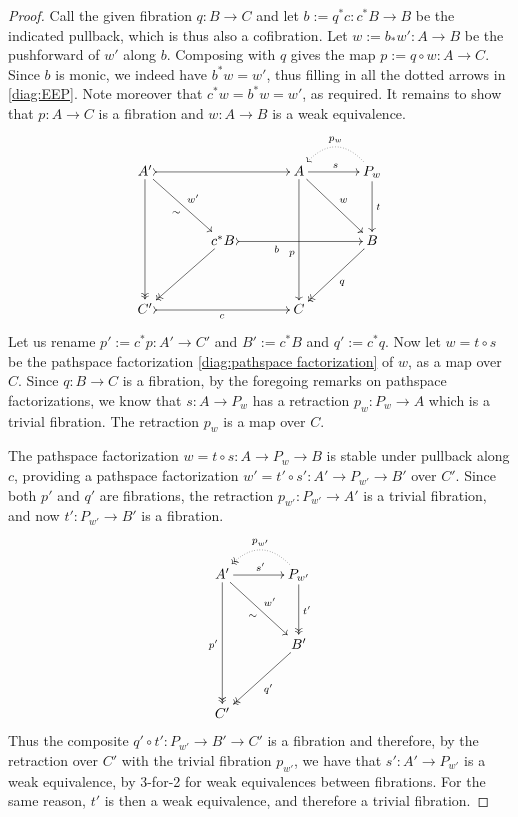 \documentclass[12pt]{article}
\newcommand{\ra}{\ensuremath{\rightarrow}}
\theoremstyle{remark}
\theoremstyle{definition}
\begin{document}
\begin{proof}
Call the given fibration $q:B\ra C$ and let $b:=  q^*c : c^*B \ra B$ be the indicated pullback, which is thus also a cofibration. Let $w := b_*w' : A\ra B$ be the pushforward of $w'$ along $b$.  Composing with $q$ gives the map $p:= q\circ w:A\ra C$.  Since $b$ is monic, we indeed have $b^*w = w'$, thus filling in all the dotted arrows in \eqref{diag:EEP}.  Note moreover that $c^*w =  b^*w = w'$, as required. It remains to show that $p:A\ra C$ is a fibration and $w : A\ra B$ is a weak equivalence.   
\begin{equation}\label{diag:EEPfactored}
\xymatrix@=1.5em{
A' \ar@{->>}[dddd] \ar[rrdd]_{\sim}^{w'} \ar@{>->}[rrrr] && && A \ar[dddd]_>>>>>>>>>>>>p \ar[rrdd]^{w} \ar[rr]^s && \ar@{.>}@/_1.5pc/[ll]_{p_w} P_w \ar[dd]^t \\
\\
&& c^*B \ar@{->>}[lldd] \ar@{>->}[rrrr]_<<<<<<<<<<b  &&&& B \ar@{->>}[lldd]^q  \\
\\
C' \ar@{>->}[rrrr]_c &&&& C &&
}
\end{equation}
Let us rename $p':= c^*p : A' \ra C'$ and $B' := c^*B$ and $q':= c^*q$.
Now let $w=t\circ s$ be the pathspace factorization \eqref{diag:pathspace factorization} of $w$, as a map over $C$.  Since $q:B \ra C$ is a fibration, by the foregoing remarks on pathspace factorizations, we know that $s : A\ra P_w$ has a retraction $p_w : P_w \ra A$ which is a trivial fibration.  The retraction $p_w$ is a map over $C$.  

The pathspace factorization $w=t\circ s : A \ra P_w \ra B$ is stable under pullback along $c$, providing a pathspace factorization $w'=t'\circ s' : A' \ra P_{w'} \ra B'$ over $C'$.  Since both $p'$ and $q'$ are fibrations, the retraction $p_{w'}: P_{w'} \ra A'$ is a trivial fibration, and now $t' : P_{w'} \ra B'$ is a fibration.
\begin{equation}\label{diag:EEPfactored2}
\xymatrix@=1.5em{
A' \ar@{->>}[dddd]_{p'} \ar[rrdd]_{\sim}^{w'}  \ar[rr]^{s'} && \ar@{.>>}@/_1.5pc/[ll]_{p_{w'}} P_{w'} 
	\ar@{->>}[dd]^{t'} \\
\\
&& B' \ar@{->>}[lldd]^{q'} \\
\\
C' &&
}
\end{equation}
Thus the composite $q'\circ t' : P_{w'} \ra B' \ra C'$ is a fibration and therefore, by the retraction over $C'$ with the trivial fibration $p_{w'}$, we have that $s' : A' \ra P_{w'}$ is a weak equivalence, by 3-for-2 for weak equivalences between fibrations.  For the same reason, $t'$ is then a weak equivalence, and therefore a trivial fibration.


\end{proof}
\end{document}
